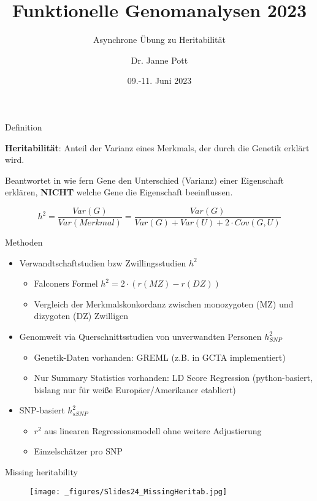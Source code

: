 \documentclass{beamer}
\title{Funktionelle Genomanalysen 2023}
\subtitle{Asynchrone Übung zu Heritabilität}
\author{Dr. Janne Pott}
\date{09.-11. Juni 2023}
\begin{document}
\begin{frame}
\titlepage
\end{frame}

\begin{frame}{Definition}

\textbf{Heritabilität}: Anteil der Varianz eines Merkmals, der durch die Genetik erklärt wird. 

Beantwortet in wie fern Gene den Unterschied (Varianz) einer Eigenschaft erklären, \textbf{NICHT} welche Gene die Eigenschaft beeinflussen. 

$$ h^2 = \frac{Var(G)}{Var(Merkmal)} = \frac{Var(G)}{Var(G) + Var(U) + 2 \cdot Cov(G, U)}$$

\end{frame}

\begin{frame}{Methoden}
\begin{itemize}
    \item Verwandtschaftstudien bzw Zwillingsstudien $h^2$
    \begin{itemize}
        \item Falconers Formel $h^2=2 \cdot (r(MZ) - r(DZ))$ 
        \item Vergleich der Merkmalskonkordanz zwischen monozygoten (MZ) und dizygoten (DZ) Zwilligen
    \end{itemize}
    \item Genomweit via Querschnittsstudien von unverwandten Personen $h_{SNP}^2$
    \begin{itemize}
        \item Genetik-Daten vorhanden: GREML (z.B. in GCTA implementiert)
        \item Nur Summary Statistics vorhanden: LD Score Regression (python-basiert, bislang nur für weiße Europäer/Amerikaner etabliert)
    \end{itemize}
    \item SNP-basiert $h_{sSNP}^2$
    \begin{itemize}
        \item $r^2$ aus linearen Regressionsmodell ohne weitere Adjustierung
        \item Einzelschätzer pro SNP 
    \end{itemize}
\end{itemize}
\end{frame}

\begin{frame}{Missing heritability}

\begin{figure}[h]
\begin{center}
\texttt{[image: \_figures/Slides24\_MissingHeritab.jpg]}
\label{fig:Heritab}
\end{center}
\end{figure}

\end{frame}
\end{document}
